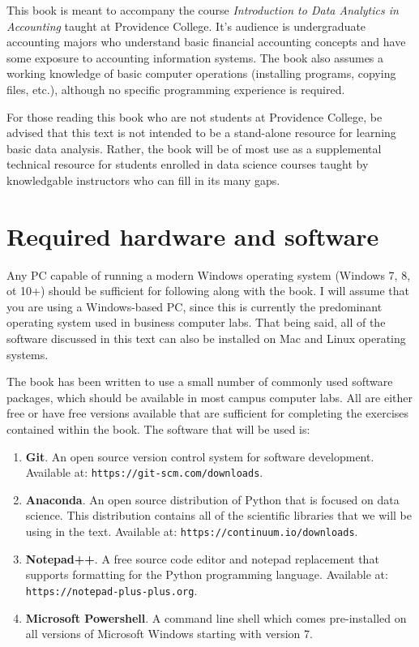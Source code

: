 \documentclass{book}
\begin{document}
This book is meant to accompany the course \textit{Introduction to Data Analytics in Accounting} taught at Providence College. It's audience is undergraduate accounting majors who understand basic financial accounting concepts and have some exposure to accounting information systems. The book also assumes a working knowledge of basic computer operations (installing programs, copying files, etc.), although no specific programming experience is required. 

For those reading this book who are not students at Providence College, be advised that this text is not intended to be a stand-alone resource for learning basic data analysis. Rather, the book will be of most use as a supplemental technical resource for students enrolled in data science courses taught by knowledgable instructors who can fill in its many gaps. 

\section{Required hardware and software}

Any PC capable of running a modern Windows operating system (Windows 7, 8, ot 10+) should be sufficient for following along with the book. I will assume that you are using a Windows-based PC, since this is currently the predominant operating system used in business computer labs. That being said, all of the software discussed in this text can also be installed on Mac and Linux operating systems.

The book has been written to use a small number of commonly used software packages, which should be available in most campus computer labs. All are either free or have free versions available that are sufficient for completing the exercises contained within the book. The software that will be used is:

\begin{enumerate}
	\item \textbf{Git}. An open source version control system for software development. Available at: \texttt{https://git-scm.com/downloads}.
	\item \textbf{Anaconda}. An open source distribution of Python that is focused on data science. This distribution contains all of the scientific libraries that we will be using in the text. Available at: \texttt{https://continuum.io/downloads}.
	\item \textbf{Notepad++}. A free source code editor and notepad replacement that supports formatting for the Python programming language. Available at: \texttt{https://notepad-plus-plus.org}.
	\item \textbf{Microsoft Powershell}. A command line shell which comes pre-installed on all versions of Microsoft Windows starting with version 7.
\end{enumerate}
\end{document}
